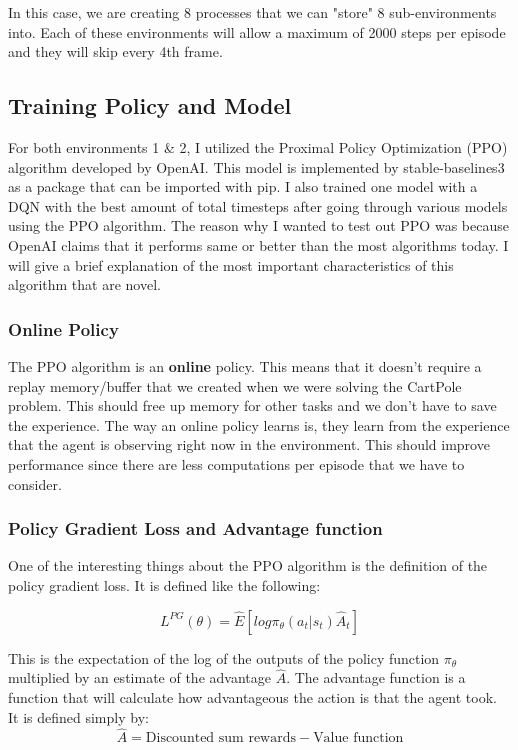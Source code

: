 \documentclass{article}
\numberwithin{equation}{section}
\numberwithin{equation}{section}
\begin{document}
In this case, we are creating 8 processes that we can "store" 8 sub-environments into. Each of these environments will allow a maximum of 2000 steps per episode and they will skip every 4th frame.


\subsection*{Training Policy and Model}

For both environments 1 \& 2, I utilized the Proximal Policy Optimization (PPO) algorithm developed by OpenAI. This model is implemented by stable-baselines3 as a package that can be imported with pip. I also trained one model with a DQN with the best amount of total timesteps after going through various models using the PPO algorithm. The reason why I wanted to test out PPO was because OpenAI claims that it performs same or better than the most algorithms today. I will give a brief explanation of the most important characteristics of this algorithm that are novel.

\subsubsection*{Online Policy}
The PPO algorithm is an \textbf{online} policy. This means that it doesn't require a replay memory/buffer that we created when we were solving the CartPole problem. This should free up memory for other tasks and we don't have to save the experience. The way an online policy learns is, they learn from the experience that the agent is observing right now in the environment. This should improve performance since there are less computations per episode that we have to consider.  

\subsubsection*{Policy Gradient Loss and Advantage function}

One of the interesting things about the PPO algorithm is the definition of the policy gradient loss. It is defined like the following:

$$
L^{PG}(\theta) = \hat{E} \left[log \pi_{\theta}(a_t | s_t) \hat{A}_t \right]
$$

This is the expectation of the log of the outputs of the policy function $\pi_{\theta}$ multiplied by an estimate of the advantage $\hat{A}$. The advantage function is a function that will calculate how advantageous the action is that the agent took. It is defined simply by:
$$
\hat{A} = \textrm{Discounted sum rewards} - \textrm{Value function} 
$$
\end{document}
